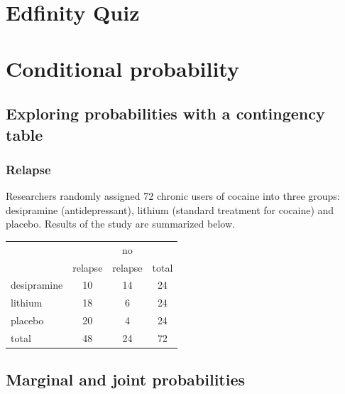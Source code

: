 \documentclass[11pt,containsverbatim,handout]{beamer}
\begin{document}
\section{Edfinity Quiz}

\section{Conditional probability}


\subsection{Exploring probabilities with a contingency table}


\begin{frame}
\frametitle{Relapse}

Researchers randomly assigned 72 chronic users of cocaine into three groups: desipramine (antidepressant), lithium (standard treatment for cocaine) and placebo. Results of the study are summarized below.

{\small
\begin{center}
\begin{tabular}{l | c c | c}
			& 		& no 		&  \\
			& relapse	& relapse	& total \\
\hline
desipramine	& 10		& 14		& 24 \\
lithium		& 18		& 6		& 24 \\
placebo		& 20		& 4		& 24 \\
\hline
total			& 48		& 24		& 72
\end{tabular}
\end{center}
}


\end{frame}


\subsection{Marginal and joint probabilities}

\end{document}
